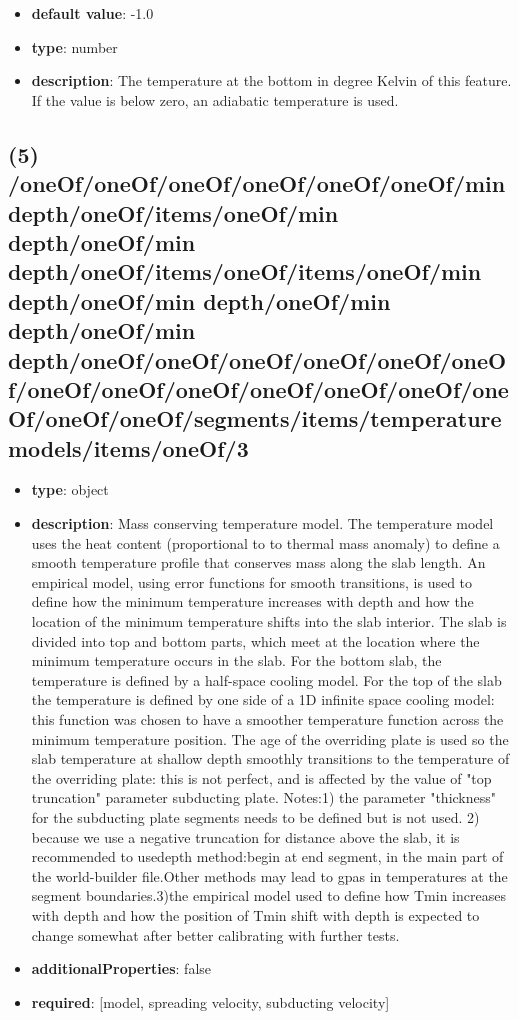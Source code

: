 \begin{itemize}[leftmargin=6em]\item {\bf default value}: -1.0
\item {\bf type}: number
\item {\bf description}: The temperature at the bottom in degree Kelvin of this feature. If the value is below zero, an adiabatic temperature is used.
\end{itemize}\subsection{(5) /oneOf/oneOf/oneOf/oneOf/oneOf/oneOf/min depth/oneOf/items/oneOf/min depth/oneOf/min depth/oneOf/items/oneOf/items/oneOf/min depth/oneOf/min depth/oneOf/min depth/oneOf/min depth/oneOf/oneOf/oneOf/oneOf/oneOf/oneOf/oneOf/oneOf/oneOf/oneOf/oneOf/oneOf/oneOf/oneOf/oneOf/segments/items/temperature models/items/oneOf/3}
\begin{itemize}[leftmargin=5em]\item {\bf type}: object
\item {\bf description}: Mass conserving temperature model. The temperature model uses the heat content (proportional to to thermal mass anomaly) to define a smooth temperature profile that conserves mass along the slab length. An empirical model, using error functions for smooth transitions, is used to  define how the minimum temperature increases with depth and how the location of the minimum temperature shifts into the slab interior. The slab is divided into top and bottom parts, which meet at the location where the minimum temperature occurs in the slab. For the bottom slab, the temperature is defined by a half-space cooling model. For the top of the slab the temperature is defined by one side of a 1D infinite space cooling model: this function was chosen to have a smoother temperature function across the minimum temperature position. The age of the overriding plate is used so the slab temperature at shallow depth smoothly transitions to the temperature of the overriding plate: this is not perfect, and is affected by the value of "top truncation" parameter subducting plate. Notes:1) the parameter "thickness" for the subducting plate segments needs to be defined but is not used. 2) because we use a negative truncation for distance above the slab, it is recommended to usedepth method:begin at end segment, in the main part of the world-builder file.Other methods may lead to gpas in temperatures at the segment boundaries.3)the empirical model used to define how Tmin increases with depth and how the position of Tmin shift with depth is expected to change somewhat after better calibrating with further tests.
\item {\bf additionalProperties}: false
\item {\bf required}: [model, spreading velocity, subducting velocity]\end{itemize}
